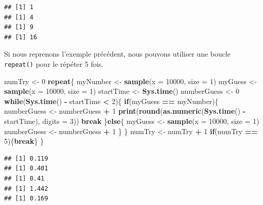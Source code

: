 \documentclass[
]{book}
\newenvironment{Shaded}{\begin{snugshade}}{\end{snugshade}}
\newcommand{\ControlFlowTok}[1]{\textcolor[rgb]{0.13,0.29,0.53}{\textbf{#1}}}
\newcommand{\DataTypeTok}[1]{\textcolor[rgb]{0.13,0.29,0.53}{#1}}
\newcommand{\DecValTok}[1]{\textcolor[rgb]{0.00,0.00,0.81}{#1}}
\newcommand{\KeywordTok}[1]{\textcolor[rgb]{0.13,0.29,0.53}{\textbf{#1}}}
\newcommand{\NormalTok}[1]{#1}
\newcommand{\OperatorTok}[1]{\textcolor[rgb]{0.81,0.36,0.00}{\textbf{#1}}}
\newcommand{\StringTok}[1]{\textcolor[rgb]{0.31,0.60,0.02}{#1}}
\begin{document}
\begin{verbatim}
## [1] 1
## [1] 4
## [1] 9
## [1] 16
\end{verbatim}

Si nous reprenons l'exemple précédent, nous pouvons utiliser une boucle \texttt{repeat()} pour le répéter 5 fois.

\begin{Shaded}
\begin{Highlighting}[]
\NormalTok{numTry <-}\StringTok{ }\DecValTok{0}
\ControlFlowTok{repeat}\NormalTok{\{}
\NormalTok{  myNumber <-}\StringTok{ }\KeywordTok{sample}\NormalTok{(}\DataTypeTok{x =} \DecValTok{10000}\NormalTok{, }\DataTypeTok{size =} \DecValTok{1}\NormalTok{)}
\NormalTok{  myGuess <-}\StringTok{ }\KeywordTok{sample}\NormalTok{(}\DataTypeTok{x =} \DecValTok{10000}\NormalTok{, }\DataTypeTok{size =} \DecValTok{1}\NormalTok{)}
\NormalTok{  startTime <-}\StringTok{ }\KeywordTok{Sys.time}\NormalTok{()}
\NormalTok{  numberGuess <-}\StringTok{ }\DecValTok{0}
  \ControlFlowTok{while}\NormalTok{(}\KeywordTok{Sys.time}\NormalTok{() }\OperatorTok{-}\StringTok{ }\NormalTok{startTime }\OperatorTok{<}\StringTok{ }\DecValTok{2}\NormalTok{)\{}
    \ControlFlowTok{if}\NormalTok{(myGuess }\OperatorTok{==}\StringTok{ }\NormalTok{myNumber)\{}
\NormalTok{      numberGuess <-}\StringTok{ }\NormalTok{numberGuess }\OperatorTok{+}\StringTok{ }\DecValTok{1}
      \KeywordTok{print}\NormalTok{(}\KeywordTok{round}\NormalTok{(}\KeywordTok{as.numeric}\NormalTok{(}\KeywordTok{Sys.time}\NormalTok{() }\OperatorTok{-}\StringTok{ }\NormalTok{startTime), }\DataTypeTok{digits =} \DecValTok{3}\NormalTok{))}
      \ControlFlowTok{break}
\NormalTok{    \}}\ControlFlowTok{else}\NormalTok{\{}
\NormalTok{      myGuess <-}\StringTok{ }\KeywordTok{sample}\NormalTok{(}\DataTypeTok{x =} \DecValTok{10000}\NormalTok{, }\DataTypeTok{size =} \DecValTok{1}\NormalTok{)}
\NormalTok{      numberGuess <-}\StringTok{ }\NormalTok{numberGuess }\OperatorTok{+}\StringTok{ }\DecValTok{1}
\NormalTok{    \}}
\NormalTok{  \}}
\NormalTok{  numTry <-}\StringTok{ }\NormalTok{numTry }\OperatorTok{+}\StringTok{ }\DecValTok{1}
  \ControlFlowTok{if}\NormalTok{(numTry }\OperatorTok{==}\StringTok{ }\DecValTok{5}\NormalTok{)\{}\ControlFlowTok{break}\NormalTok{\}}
\NormalTok{\}}
\end{Highlighting}
\end{Shaded}

\begin{verbatim}
## [1] 0.119
## [1] 0.401
## [1] 0.41
## [1] 1.442
## [1] 0.169
\end{verbatim}
\end{document}

